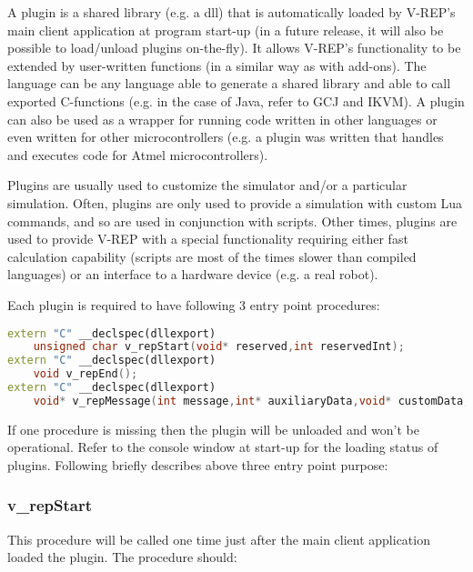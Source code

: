 \label{plugin}

A plugin is a shared library (e.g. a dll) that is automatically loaded by 
V-REP's main client application at program start-up (in a future release, it 
will also be possible to load/unload plugins on-the-fly). It allows V-REP's
functionality to be extended by user-written functions (in a similar way as 
with add-ons). The language can be any language able to generate a shared 
library and able to call exported C-functions (e.g. in the case of Java, 
refer to GCJ and IKVM). A plugin can also be used as a wrapper for running 
code written in other languages or even written for other microcontrollers 
(e.g. a plugin was written that handles and executes code for Atmel 
microcontrollers).

Plugins are usually used to customize the simulator and/or a particular 
simulation. Often, plugins are only used to provide a simulation with custom
Lua commands, and so are used in conjunction with scripts. Other times, 
plugins are used to provide V-REP with a special functionality requiring 
either fast calculation capability (scripts are most of the times slower 
than compiled languages) or an interface to a hardware device (e.g. a real 
robot).

Each plugin is required to have following 3 entry point procedures:
\begin{lstlisting}[language=C++]
extern "C" __declspec(dllexport)
	unsigned char v_repStart(void* reserved,int reservedInt);
extern "C" __declspec(dllexport)
	void v_repEnd();
extern "C" __declspec(dllexport)
	void* v_repMessage(int message,int* auxiliaryData,void* customData,int* replyData);
\end{lstlisting}

If one procedure is missing then the plugin will be unloaded and won't be 
operational. Refer to the console window at start-up for the loading status 
of plugins. Following briefly describes above three entry point purpose:

\subsubsection{v\_repStart}

This procedure will be called one time just after the main client application 
loaded the plugin. The procedure should:

